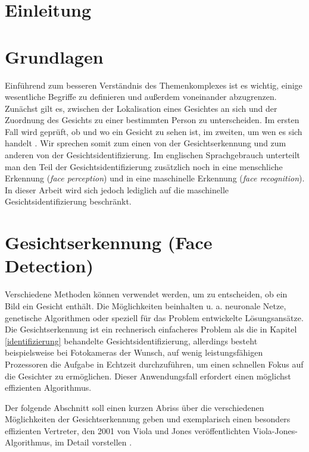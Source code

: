 \documentclass[doktyp=semarbeit, sprache=german]{TUBAFarbeiten}
\begin{document}
\maketitle
\tableofcontents
\newpage
\section{Einleitung}
\section{Grundlagen}
Einführend zum besseren Verständnis des Themenkomplexes ist es wichtig, einige wesentliche Begriffe zu definieren und außerdem voneinander abzugrenzen. Zunächst gilt es, zwischen der Lokalisation eines Gesichtes an sich und der Zuordnung des Gesichts zu einer bestimmten Person zu unterscheiden. Im ersten Fall wird geprüft, ob und wo ein Gesicht zu sehen ist, im zweiten, um wen es sich handelt \cite{FaceRecognitionWikipedia}. Wir sprechen somit zum einen von der Gesichtserkennung und zum anderen von der Gesichtsidentifizierung. Im englischen Sprachgebrauch unterteilt man den Teil der Gesichtsidentifizierung zusätzlich noch in eine menschliche Erkennung (\textit{face perception}) und in eine maschinelle Erkennung (\textit{face recognition}). In dieser Arbeit wird sich jedoch lediglich auf die maschinelle Gesichtsidentifizierung beschränkt.

\section{Gesichtserkennung (Face Detection)}

Verschiedene Methoden können verwendet werden, um zu entscheiden, ob ein Bild ein Gesicht enthält. Die Möglichkeiten beinhalten u. a. neuronale Netze, genetische Algorithmen oder speziell für das Problem entwickelte Lösungsansätze. Die Gesichtserkennung ist ein rechnerisch einfacheres Problem als die in Kapitel \ref{identifizierung} behandelte Gesichtsidentifizierung, allerdings besteht beispielsweise bei Fotokameras der Wunsch, auf wenig leistungsfähigen Prozessoren die Aufgabe in Echtzeit durchzuführen, um einen schnellen Fokus auf die Gesichter zu ermöglichen. Dieser Anwendungsfall erfordert einen möglichst effizienten Algorithmus.  

Der folgende Abschnitt soll einen kurzen Abriss über die verschiedenen Möglichkeiten der Gesichtserkennung geben und exemplarisch einen besonders effizienten Vertreter, den 2001 von Viola und Jones veröffentlichten Viola-Jones-Algorithmus, im Detail vorstellen \cite{Viola01rapidobject}.
\end{document}
